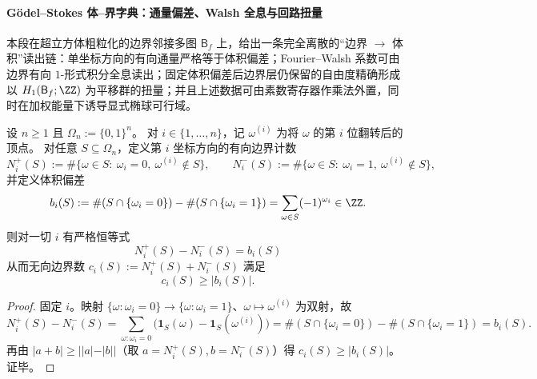 \paragraph{Gödel--Stokes 体--界字典：通量偏差、Walsh 全息与回路扭量}
\label{par:fold-hypercube-godel-stokes-walsh-hodge}
本段在超立方体粗粒化的边界邻接多图 \(\mathsf B_f\) 上，给出一条完全离散的“边界 \(\to\) 体积”读出链：单坐标方向的有向通量严格等于体积偏差；Fourier--Walsh 系数可由边界有向 \(1\)-形式积分全息读出；固定体积偏差后边界层仍保留的自由度精确形成以 \(H_1(\mathsf B_f;\ZZ)\) 为平移群的扭量；并且上述数据可由素数寄存器作乘法外置，同时在加权能量下诱导显式椭球可行域。

\begin{proposition}\label{prop:fold-hypercube-godel-stokes-flux-bias}
设 \(n\ge 1\) 且 \(\Omega_n:=\{0,1\}^n\)。
对 \(i\in\{1,\dots,n\}\)，记 \(\omega^{(i)}\) 为将 \(\omega\) 的第 \(i\) 位翻转后的顶点。
对任意 \(S\subseteq\Omega_n\)，定义第 \(i\) 坐标方向的有向边界计数
\[
N_i^+(S):=\#\{\omega\in S:\ \omega_i=0,\ \omega^{(i)}\notin S\},
\qquad
N_i^-(S):=\#\{\omega\in S:\ \omega_i=1,\ \omega^{(i)}\notin S\},
\]
并定义体积偏差
\[
b_i(S):=\#(S\cap\{\omega_i=0\})-\#(S\cap\{\omega_i=1\})
=\sum_{\omega\in S}(-1)^{\omega_i}\in\ZZ.
\]
则对一切 \(i\) 有严格恒等式
\[
\boxed{\;N_i^+(S)-N_i^-(S)=b_i(S)\;}
\]
从而无向边界数 \(c_i(S):=N_i^+(S)+N_i^-(S)\) 满足
\[
c_i(S)\ge |b_i(S)|.
\]
\end{proposition}
\begin{proof}
固定 \(i\)。映射 \(\{\omega:\omega_i=0\}\to\{\omega:\omega_i=1\}\)、\(\omega\mapsto\omega^{(i)}\) 为双射，故
\[
N_i^+(S)-N_i^-(S)
=\sum_{\omega:\omega_i=0}\bigl(\mathbf 1_S(\omega)-\mathbf 1_S(\omega^{(i)})\bigr)
=\#(S\cap\{\omega_i=0\})-\#(S\cap\{\omega_i=1\})
=b_i(S).
\]
再由 \(|a+b|\ge ||a|-|b||\)（取 \(a=N_i^+(S),b=N_i^-(S)\)）得 \(c_i(S)\ge |b_i(S)|\)。证毕。
\end{proof}

